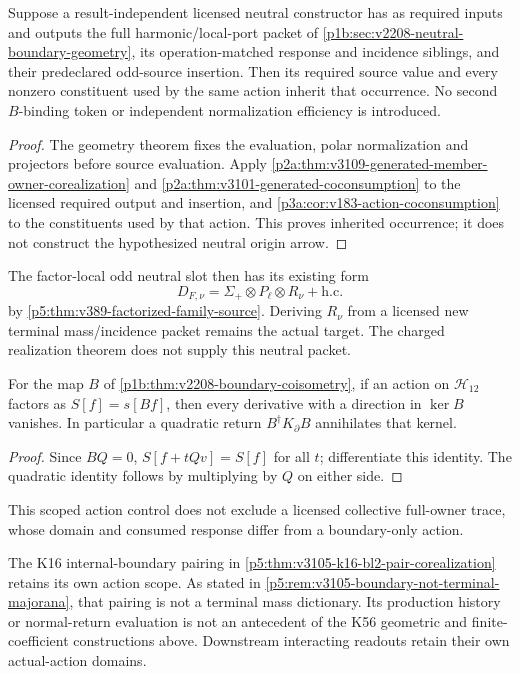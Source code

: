 \documentclass[12pt,a4paper]{article}
\begin{document}
\begin{theorem}
\label{p5:thm:v2208-neutral-boundary-export}
Suppose a result-independent licensed neutral constructor has as required
inputs and outputs the full harmonic/local-port packet of
\ref{p1b:sec:v2208-neutral-boundary-geometry}, its operation-matched response
and incidence siblings, and their predeclared odd-source insertion.
Then its required source value and every nonzero constituent used by the
same action inherit that occurrence. No second $B$-binding token or
independent normalization efficiency is introduced.
\end{theorem}
\begin{proof}
The geometry theorem fixes the evaluation, polar normalization and
projectors before source evaluation. Apply
\ref{p2a:thm:v3109-generated-member-owner-corealization} and
\ref{p2a:thm:v3101-generated-coconsumption} to the licensed required
output and insertion, and \ref{p3a:cor:v183-action-coconsumption} to
the constituents used by that action. This proves inherited occurrence;
it does not construct the hypothesized neutral origin arrow.
\end{proof}
The factor-local odd neutral slot then has its existing form
\[
 D_{F,\nu}=\Sigma_+\otimes P_\ell\otimes R_\nu+\mathrm{h.c.}
\]
by \ref{p5:thm:v389-factorized-family-source}. Deriving $R_\nu$ from a
licensed new terminal mass/incidence packet remains the actual target.
The charged realization theorem does not supply this neutral packet.

\begin{proposition}
\label{p5:prop:v2208-boundary-only-kernel}
For the map $B$ of \ref{p1b:thm:v2208-boundary-coisometry}, if an action
on $\mathcal H_{12}$ factors as $S[f]=s[Bf]$, then every derivative
with a direction in $\ker B$ vanishes. In particular a quadratic return
$B^\dagger K_\partial B$ annihilates that kernel.
\end{proposition}
\begin{proof}
Since $BQ=0$, $S[f+tQv]=S[f]$ for all $t$; differentiate this identity.
The quadratic identity follows by multiplying by $Q$ on either side.
\end{proof}
This scoped action control does not exclude a licensed collective full-owner
trace, whose domain and consumed response differ from a boundary-only action.

The K16 internal-boundary pairing in
\ref{p5:thm:v3105-k16-bl2-pair-corealization} retains its own action
scope. As stated in \ref{p5:rem:v3105-boundary-not-terminal-majorana},
that pairing is not a terminal mass dictionary. Its production history or
normal-return evaluation is not an antecedent of the K56 geometric and
finite-coefficient constructions above. Downstream interacting readouts
retain their own actual-action domains.
\end{document}
